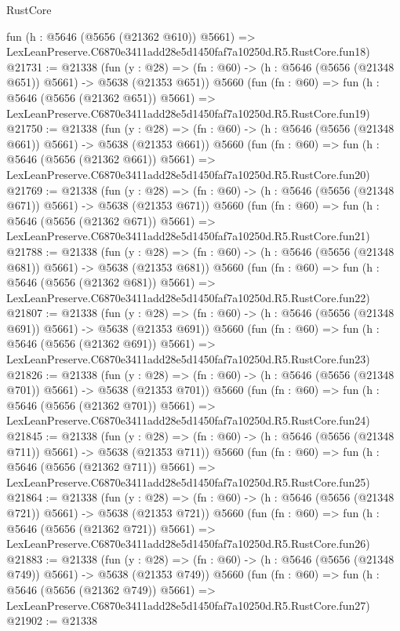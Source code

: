 \begin{lexlean}{RustCore}
\begin{coremodule}
    fun (h : @5646 (@5656 (@21362 @610)) @5661) =>
    LexLeanPreserve.C6870e3411add28e5d1450faf7a10250d.R5.RustCore.fun18)
@21731 := @21338
    (fun (y : @28) => (fn : @60) -> (h : @5646 (@5656 (@21348 @651)) @5661) -> @5638 (@21353 @651))
    @5660
    (fun (fn : @60) =>
    fun (h : @5646 (@5656 (@21362 @651)) @5661) =>
    LexLeanPreserve.C6870e3411add28e5d1450faf7a10250d.R5.RustCore.fun19)
@21750 := @21338
    (fun (y : @28) => (fn : @60) -> (h : @5646 (@5656 (@21348 @661)) @5661) -> @5638 (@21353 @661))
    @5660
    (fun (fn : @60) =>
    fun (h : @5646 (@5656 (@21362 @661)) @5661) =>
    LexLeanPreserve.C6870e3411add28e5d1450faf7a10250d.R5.RustCore.fun20)
@21769 := @21338
    (fun (y : @28) => (fn : @60) -> (h : @5646 (@5656 (@21348 @671)) @5661) -> @5638 (@21353 @671))
    @5660
    (fun (fn : @60) =>
    fun (h : @5646 (@5656 (@21362 @671)) @5661) =>
    LexLeanPreserve.C6870e3411add28e5d1450faf7a10250d.R5.RustCore.fun21)
@21788 := @21338
    (fun (y : @28) => (fn : @60) -> (h : @5646 (@5656 (@21348 @681)) @5661) -> @5638 (@21353 @681))
    @5660
    (fun (fn : @60) =>
    fun (h : @5646 (@5656 (@21362 @681)) @5661) =>
    LexLeanPreserve.C6870e3411add28e5d1450faf7a10250d.R5.RustCore.fun22)
@21807 := @21338
    (fun (y : @28) => (fn : @60) -> (h : @5646 (@5656 (@21348 @691)) @5661) -> @5638 (@21353 @691))
    @5660
    (fun (fn : @60) =>
    fun (h : @5646 (@5656 (@21362 @691)) @5661) =>
    LexLeanPreserve.C6870e3411add28e5d1450faf7a10250d.R5.RustCore.fun23)
@21826 := @21338
    (fun (y : @28) => (fn : @60) -> (h : @5646 (@5656 (@21348 @701)) @5661) -> @5638 (@21353 @701))
    @5660
    (fun (fn : @60) =>
    fun (h : @5646 (@5656 (@21362 @701)) @5661) =>
    LexLeanPreserve.C6870e3411add28e5d1450faf7a10250d.R5.RustCore.fun24)
@21845 := @21338
    (fun (y : @28) => (fn : @60) -> (h : @5646 (@5656 (@21348 @711)) @5661) -> @5638 (@21353 @711))
    @5660
    (fun (fn : @60) =>
    fun (h : @5646 (@5656 (@21362 @711)) @5661) =>
    LexLeanPreserve.C6870e3411add28e5d1450faf7a10250d.R5.RustCore.fun25)
@21864 := @21338
    (fun (y : @28) => (fn : @60) -> (h : @5646 (@5656 (@21348 @721)) @5661) -> @5638 (@21353 @721))
    @5660
    (fun (fn : @60) =>
    fun (h : @5646 (@5656 (@21362 @721)) @5661) =>
    LexLeanPreserve.C6870e3411add28e5d1450faf7a10250d.R5.RustCore.fun26)
@21883 := @21338
    (fun (y : @28) => (fn : @60) -> (h : @5646 (@5656 (@21348 @749)) @5661) -> @5638 (@21353 @749))
    @5660
    (fun (fn : @60) =>
    fun (h : @5646 (@5656 (@21362 @749)) @5661) =>
    LexLeanPreserve.C6870e3411add28e5d1450faf7a10250d.R5.RustCore.fun27)
@21902 := @21338

\end{coremodule}
\end{lexlean}

